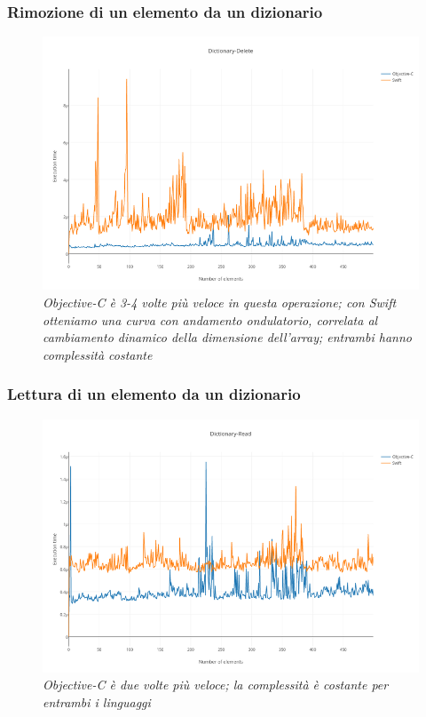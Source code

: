 \subsubsection{Rimozione di un elemento da un dizionario}
\begin{figure}[H]
      \centering
      \includegraphics[scale=0.50]{immagini/dictionary_delete.png}
            \vspace{0.8cm}
            \caption{\textit{Objective-C è 3-4 volte più veloce in questa operazione; con Swift otteniamo una curva con andamento ondulatorio, correlata al cambiamento dinamico della dimensione dell'array; entrambi hanno complessità costante}}
\end{figure}
\subsubsection{Lettura di un elemento da un dizionario}
\begin{figure}[H]
      \centering
      \includegraphics[scale=0.50]{immagini/dictionary_read.png}
            \vspace{0.8cm}
            \caption{\textit{Objective-C è due volte più veloce; la complessità è costante per entrambi i linguaggi}}
\end{figure}
